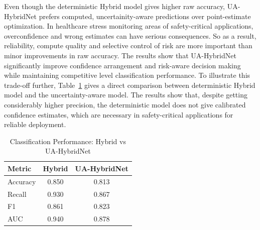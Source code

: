 \documentclass[conference]{IEEEtran}
\begin{document}
\begin{table}[H]
\centering
\caption{Performance Comparison Across All Architectures}
\label{tab:all_arch_comparison}
\footnotesize
{}
\end{table}

Even though the deterministic Hybrid model gives higher raw accuracy, UA-HybridNet prefers computed, uncertainity-aware predictions over point-estimate optimization. In healthcare stress monitoring areas of safety-critical applications, overconfidence and wrong estimates can have serious consequences. So as a result, reliability, compute quality and selective control of risk are more important than minor improvements in raw accuracy. The results show that UA-HybridNet significantly improve confidence arrangement and risk-aware decision making while maintaining competitive level classification performance. To illustrate this trade-off further, Table~\ref{tab:hybrid_vs_UA-HybridNet} gives a direct comparison between deterministic Hybrid model and the uncertainty-aware model. The results show that, despite getting considerably higher precision, the deterministic model does not give calibrated confidence estimates, which are necessary in safety-critical applications for reliable deployment.
\begin{table}[htpb]
\centering
\caption{Classification Performance: Hybrid vs UA-HybridNet}
\label{tab:hybrid_vs_UA-HybridNet}
\footnotesize
\setlength{\tabcolsep}{4pt}
\renewcommand{\arraystretch}{1.0}
\begin{tabular}{lcc}
\hline
\textbf{Metric} & \textbf{Hybrid} & \textbf{UA-HybridNet} \\
\hline
Accuracy & 0.850 & 0.813 \\
Recall  & 0.930 & 0.867 \\
F1      & 0.861 & 0.823 \\
AUC     & 0.940 & 0.878 \\
\hline
\end{tabular}
\end{table}
\end{document}
